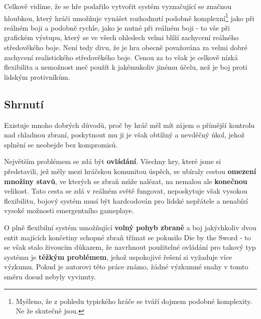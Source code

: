 Celkově vidíme, že se hře podařilo vytvořit systém vyznačující se značnou hloubkou, který hráči umožňuje vynášet rozhodnutí podobně komplexní\footnote{Myšleno, že z pohledu typického hráče se tváří dojmem podobné komplexity. Ne že skutečně jsou.} jako při reálném boji a podobně rychle, jako je nutné při reálném boji - to vše při grafickém výstupu, který se ve všech ohledech velmi blíží zachycení reálného středověkého boje. Není tedy divu, že je hra obecně považována za velmi dobré zachycení realistického středověkého boje. Cenou za to však je celkově nízká flexibilita a nemožnost meč použít k jakémukoliv jinému účelu, než je boj proti lidským protivníkům.

\subsection{Shrnutí}

Existuje mnoho dobrých důvodů, proč by hráč měl mít zájem o přímější kontrolu nad chladnou zbraní, poskytnout mu ji je však obtížný a nevděčný úkol, jehož splnění se neobejde bez kompromisů.  

Největším problémem se zdá být \textbf{ovládání}. Všechny hry, které jsme si představili, jež měly mezi hráčskou komunitou úspěch, se ubíraly cestou \textbf{omezení množiny stavů}, ve kterých se zbraň může nalézat, na nemalou ale \textbf{konečnou} velikost. Tato cesta se zdá v reálném světě fungovat, neposkytuje však vysokou flexibilitu, bojový systém musí být hardcodován pro lidské nepřátele a nenabízí vysoké možnosti emergentního gameplaye. 

O plně flexibilní systém umožňující \textbf{volný pohyb zbraně} a boj jakýchkoliv dvou entit majících končetiny schopné zbraň třímat se pokusilo Die by the Sword \cite{DieByTheSword} - to se však stalo živoucím důkazem, že navrhnout použitelné ovládání pro takový typ systému je \textbf{těžkým problémem}, jehož uspokojivé řešení si vyžaduje více výzkumu. Pokud je autorovi této práce známo, žádné výzkumné snahy v tomto směru dosud nebyly vyvinuty.



